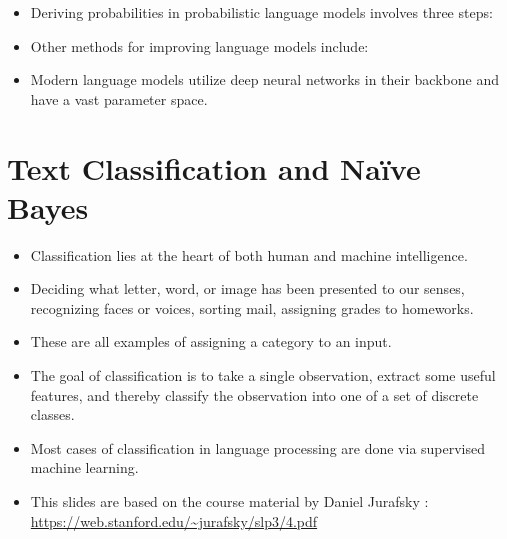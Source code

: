 \documentclass{book}
\begin{document}
    \begin{itemize}
        \item Deriving probabilities in probabilistic language models involves three steps:
        \item Other methods for improving language models include:
        \item Modern language models utilize deep neural networks in their backbone and have a vast parameter space.
    \end{itemize}


\chapter{Text Classification and Naïve Bayes}

    \begin{itemize}
        \item Classification lies at the heart of both human and machine intelligence. 
        \item Deciding what letter, word, or image has been presented to our senses, recognizing faces or voices, sorting mail, assigning grades to homeworks.
        \item These are all examples of assigning a category to an input.
        \item The goal of classification is to take a single observation, extract some useful features, and thereby classify the observation into one of a set of discrete classes.
        \item  Most cases of classification in language processing are done via supervised machine learning. 
        \item This slides are based on the course material by Daniel Jurafsky : \url{https://web.stanford.edu/~jurafsky/slp3/4.pdf} 
    \end{itemize}   
\end{document}
